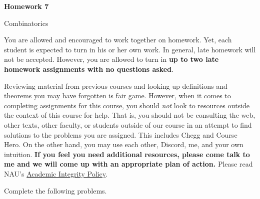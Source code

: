 \documentclass[11pt]{article}%
\theoremstyle{definition}
\newcommand{\blankline}{\pagebreak[2]\vspace{.5\baselineskip}}
\begin{document}
\begin{center}
{\Large\bf Homework 7}

\smallskip

Combinatorics
\end{center}

\thispagestyle{fancy}

You are allowed and encouraged to work together on homework. Yet, each student is expected to turn in his or her own work. In general, late homework will not be accepted. However, you are allowed to turn in \textbf{up to two late homework assignments with no questions asked}. 

\blankline

Reviewing material from previous courses and looking up definitions and theorems you may have forgotten is fair game. However, when it comes to completing assignments for this course, you should \emph{not} look to resources outside the context of this course for help.  That is, you should not be consulting the web, other texts, other faculty, or students outside of our course in an attempt to find solutions to the problems you are assigned.  This includes Chegg and Course Hero. On the other hand, you may use each other, Discord, me, and your own intuition. \textbf{If you feel you need additional resources, please come talk to me and we will come up with an appropriate plan of action.} Please read NAU's \href{https://www5.nau.edu/policies/Client/Details/828?whoIsLooking=Students&pertainsTo=All&sortDirection=Ascending&page=1}{Academic Integrity Policy}.

\blankline

Complete the following problems. 
\end{document}
